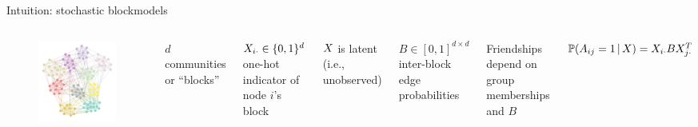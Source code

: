 \documentclass[aspectratio=169]{beamer}
\theoremstyle{remark}
\begin{document}
\begin{frame}{Intuition: stochastic blockmodels}

    \begin{columns}

        \begin{figure}
            \includegraphics[width=\textwidth]{figures/assortative.png}
        \end{figure}


        $d$ communities or ``blocks''

        $X_{i \cdot} \in \{0, 1\}^d$ one-hot indicator of node $i$'s block

        \vspace{4mm}

        $X$ is latent (i.e., unobserved)

        \vspace{4mm}

        $B \in [0, 1]^{d \times d}$ inter-block edge probabilities

        \vspace{4mm}

        Friendships depend on group memberships and $B$

        $\P[\X]{A_{ij} = 1} = \X_{i \cdot} B \X_{j \cdot}^T$

    \end{columns}

\end{frame}
\end{document}
